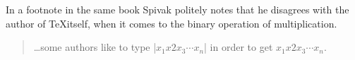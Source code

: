 In a footnote in the same book Spivak politely notes that he disagrees with the author of \TeX itself, when it comes to the binary operation of multiplication.

\begin{quotation}

\dots some authors like to type |$x_1x2x_3\dotsb x_n$| in order to get $x_1x2x_3\dotsb x_n$.
\end{quotation}







